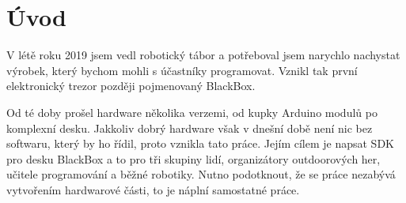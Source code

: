 \chapter*{Úvod}

V létě roku 2019 jsem vedl robotický tábor a potřeboval jsem narychlo nachystat výrobek, který bychom mohli s účastníky programovat.
Vznikl tak první elektronický trezor později pojmenovaný BlackBox.

Od té doby prošel hardware několika verzemi, od kupky Arduino modulů po komplexní desku.
Jakkoliv dobrý hardware však v dnešní době není nic bez softwaru, který by ho řídil, proto vznikla tato práce.
Jejím cílem je napsat SDK pro desku BlackBox a to pro tři skupiny lidí, organizátory outdoorových her, učitele programování a běžné robotiky.
Nutno podotknout, že se práce nezabývá vytvořením hardwarové části, to je náplní samostatné práce\cite{BlackBox_hardware}.


